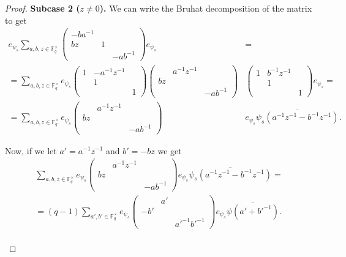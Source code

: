 \documentclass[12pt,reqno]{amsart}
\theoremstyle{definition}
\theoremstyle{remark}
\numberwithin{equation}{section}
\begin{document}
\begin{proof}
    \textbf{Subcase 2 ($z \ne 0$).} We can write the Bruhat decomposition of the matrix to get
    \begin{align*}
        e_{\psi_s}\sum_{a, b, z \in \mathbb{F}_q^\times}\begin{pmatrix}
        -ba^{-1} & &\\
        bz & 1 & \\
         &  & -ab^{-1}
    \end{pmatrix} e_{\psi_s} &=\\= \sum_{a, b, z \in \mathbb{F}_q^\times} e_{\psi_s}\begin{pmatrix}
        1 & -a^{-1} z^{-1} & \\
        & 1 & \\
        & & 1
    \end{pmatrix}\begin{pmatrix}
        & a^{-1} z^{-1} &\\
        bz & & \\
        & & -ab^{-1}
    \end{pmatrix}&\begin{pmatrix}
        1 & b^{-1}z^{-1} &\\
        & 1 &\\
        & & 1
    \end{pmatrix} e_{\psi_s}=\\
    = \sum_{a, b, z \in \mathbb{F}_q^\times} e_{\psi_s} \begin{pmatrix}
        & a^{-1}z^{-1} &\\
        bz & & \\
        & & -ab^{-1}
    \end{pmatrix}&e_{\psi_s}\overline{\psi_s(a^{-1}z^{-1}-b^{-1}z^{-1})}.
    \end{align*}

    Now, if we let $a' = a^{-1}z^{-1}$ and $b' = -bz$ we get
    \begin{align*}
        \sum_{a, b, z \in \mathbb{F}_q^\times} e_{\psi_s} \begin{pmatrix}
        & a^{-1}z^{-1} &\\
        bz & & \\
        & & -ab^{-1}
    \end{pmatrix}e_{\psi_s}\overline{\psi_s(a^{-1}z^{-1}-b^{-1}z^{-1})} =\\= (q-1) \sum_{a', b' \in \mathbb{F}_q^\times} e_{\psi_s} \begin{pmatrix}
        & a' & \\
        -b' & & \\
        & & a'^{-1}b'^{-1}
    \end{pmatrix} e_{\psi_s} \overline{\psi(a' + b'^{-1})}.
    \end{align*}\\
    

\end{proof}
\end{document}
